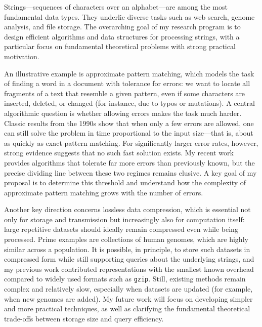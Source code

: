 \documentclass[a4paper,11pt]{article}
\begin{document}
\thispagestyle{firststyle}

Strings—sequences of characters over an alphabet—are among the most fundamental data types. They underlie diverse tasks such as web search, genome analysis, and file storage. The overarching goal of my research program is to design efficient algorithms and data structures for processing strings, with a particular focus on fundamental theoretical problems with strong practical motivation.

An illustrative example is approximate pattern matching, which models the task of finding a word in a document with tolerance for errors: we want to locate all fragments of a text that resemble a given pattern, even if some characters are inserted, deleted, or changed (for instance, due to typos or mutations). A central algorithmic question is whether allowing errors makes the task much harder. Classic results from the 1990s show that when only a few errors are allowed, one can still solve the problem in time proportional to the input size—that is, about as quickly as exact pattern matching. For significantly larger error rates, however, strong evidence suggests that no such fast solution exists. My recent work provides algorithms that tolerate far more errors than previously known, but the precise dividing line between these two regimes remains elusive. A key goal of my proposal is to determine this threshold and understand how the complexity of approximate pattern matching grows with the number of errors.

Another key direction concerns lossless data compression, which is essential not only for storage and transmission but increasingly also for computation itself: large repetitive datasets should ideally remain compressed even while being processed. Prime examples are collections of human genomes, which are highly similar across a population. It is possible, in principle, to store such datasets in compressed form while still supporting queries about the underlying strings, and my previous work contributed representations with the smallest known overhead compared to widely used formats such as \texttt{gzip}. Still, existing methods remain complex and relatively slow, especially when datasets are updated (for example, when new genomes are added). My future work will focus on developing simpler and more practical techniques, as well as clarifying the fundamental theoretical trade-offs between storage size and query efficiency.
\end{document}
